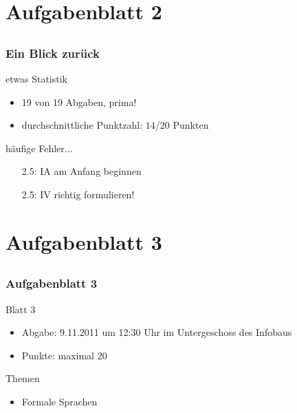\section[Blatt 2]{Aufgabenblatt 2}
\subsection*{}
\begin{frame}
	\frametitle{Ein Blick zurück}
	\begin{block}{etwas Statistik}
		\begin{itemize}
			\item 19 von 19 Abgaben, prima!
			\item durchschnittliche Punktzahl: $14$/$20$ Punkten 
		\end{itemize}
	\end{block}

	\begin{block}{häufige Fehler...}
		\begin{itemize}
			\item[2.5:] IA am Anfang beginnen
			\item[2.5:] IV richtig formulieren!
		 \end{itemize}
	\end{block}

\end{frame}

\section[Blatt 3]{Aufgabenblatt 3}
\subsection*{}
\begin{frame}
        \frametitle{Aufgabenblatt 3}
        \begin{block}{Blatt 3}
					\begin{itemize}
						\item Abgabe: 9.11.2011 um 12:30 Uhr im Untergeschoss des Infobaus
						\item Punkte: maximal 20
					\end{itemize}
        \end{block}
        \begin{block}{Themen}
        \begin{itemize}
          	\item Formale Sprachen
        \end{itemize}
        \end{block}
\end{frame}
